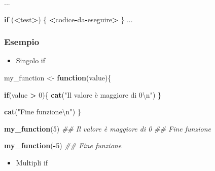 \documentclass[
]{book}
\newenvironment{Shaded}{\begin{snugshade}}{\end{snugshade}}
\newcommand{\CharTok}[1]{\textcolor[rgb]{0.31,0.60,0.02}{#1}}
\newcommand{\CommentTok}[1]{\textcolor[rgb]{0.56,0.35,0.01}{\textit{#1}}}
\newcommand{\ControlFlowTok}[1]{\textcolor[rgb]{0.13,0.29,0.53}{\textbf{#1}}}
\newcommand{\DecValTok}[1]{\textcolor[rgb]{0.00,0.00,0.81}{#1}}
\newcommand{\KeywordTok}[1]{\textcolor[rgb]{0.13,0.29,0.53}{\textbf{#1}}}
\newcommand{\NormalTok}[1]{#1}
\newcommand{\OperatorTok}[1]{\textcolor[rgb]{0.81,0.36,0.00}{\textbf{#1}}}
\newcommand{\StringTok}[1]{\textcolor[rgb]{0.31,0.60,0.02}{#1}}
\providecommand{\tightlist}{%
  \setlength{\itemsep}{0pt}\setlength{\parskip}{0pt}}
\begin{document}
\begin{Shaded}
\begin{Highlighting}[]
\NormalTok{  ...}
  
  \ControlFlowTok{if}\NormalTok{ (}\OperatorTok{<}\NormalTok{test}\OperatorTok{>}\NormalTok{) \{}
    \OperatorTok{<}\NormalTok{codice}\OperatorTok{-}\NormalTok{da}\OperatorTok{-}\NormalTok{eseguire}\OperatorTok{>}
\StringTok{  }\NormalTok{\}}
\NormalTok{  ...}
\end{Highlighting}
\end{Shaded}

\hypertarget{esempio}{%
\subsubsection*{Esempio}\label{esempio}}

\begin{itemize}
\tightlist
\item
  Singolo if
\end{itemize}

\begin{Shaded}
\begin{Highlighting}[]
\NormalTok{my_function <-}\StringTok{ }\ControlFlowTok{function}\NormalTok{(value)\{}
  
  \ControlFlowTok{if}\NormalTok{(value }\OperatorTok{>}\StringTok{ }\DecValTok{0}\NormalTok{)\{}
    \KeywordTok{cat}\NormalTok{(}\StringTok{"Il valore è maggiore di 0}\CharTok{\textbackslash{}n}\StringTok{"}\NormalTok{)}
\NormalTok{  \}}
  
  \KeywordTok{cat}\NormalTok{(}\StringTok{"Fine funzione}\CharTok{\textbackslash{}n}\StringTok{"}\NormalTok{)}
\NormalTok{\}}

\KeywordTok{my_function}\NormalTok{(}\DecValTok{5}\NormalTok{)}
\CommentTok{## Il valore è maggiore di 0}
\CommentTok{## Fine funzione}

\KeywordTok{my_function}\NormalTok{(}\OperatorTok{-}\DecValTok{5}\NormalTok{)}
\CommentTok{## Fine funzione}
\end{Highlighting}
\end{Shaded}

\begin{itemize}
\tightlist
\item
  Multipli if
\end{itemize}
\end{document}
